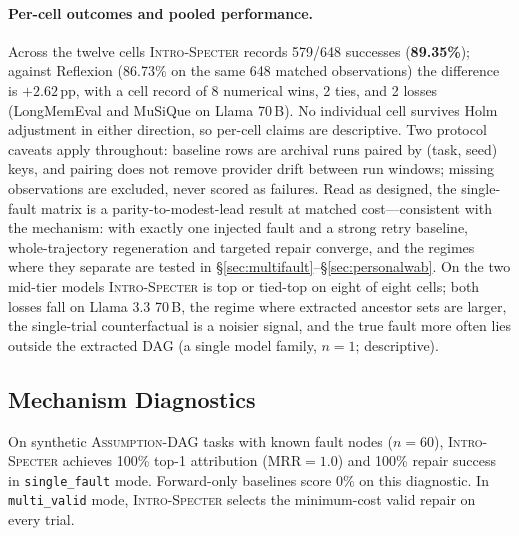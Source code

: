 \documentclass{article}
\newcommand{\method}{\textsc{Intro-Specter}\xspace}
\newcommand{\dagg}{\textsc{Assumption-DAG}\xspace}
\begin{document}

\paragraph{Per-cell outcomes and pooled performance.} Across the twelve cells \method records 579/648 successes (\textbf{89.35\%}); against Reflexion (86.73\% on the same 648 matched observations) the difference is $+2.62$\,pp, with a cell record of 8 numerical wins, 2 ties, and 2 losses (LongMemEval and MuSiQue on Llama 70\,B). No individual cell survives Holm adjustment in either direction, so per-cell claims are descriptive. Two protocol caveats apply throughout: baseline rows are archival runs paired by (task, seed) keys, and pairing does not remove provider drift between run windows; missing observations are excluded, never scored as failures. Read as designed, the single-fault matrix is a parity-to-modest-lead result at matched cost---consistent with the mechanism: with exactly one injected fault and a strong retry baseline, whole-trajectory regeneration and targeted repair converge, and the regimes where they separate are tested in \S\ref{sec:multifault}--\S\ref{sec:personalwab}. On the two mid-tier models \method is top or tied-top on eight of eight cells; both losses fall on Llama 3.3 70\,B, the regime where extracted ancestor sets are larger, the single-trial counterfactual is a noisier signal, and the true fault more often lies outside the extracted DAG (a single model family, $n{=}1$; descriptive).


\subsection{Mechanism Diagnostics}

On synthetic \dagg tasks with known fault nodes ($n{=}60$), \method achieves 100\% top-1 attribution (MRR${=}1.0$) and 100\% repair success in \texttt{single\_fault} mode. Forward-only baselines score 0\% on this diagnostic. In \texttt{multi\_valid} mode, \method selects the minimum-cost valid repair on every trial.
\end{document}
